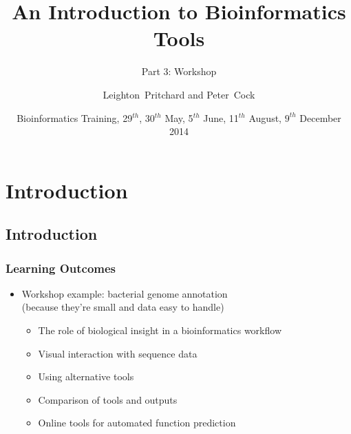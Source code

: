 
%



\title[Intro to Bioinformatics] %
{An Introduction to Bioinformatics Tools}
\subtitle{Part 3: Workshop}
\author[Pritchard, Cock] %
{Leighton~Pritchard and Peter~Cock}
\date[May, June, August, December 2014] %
{Bioinformatics Training, 29$^{th}$, 30$^{th}$ May, 5$^{th}$ June, 11$^{th}$ August, $9^{th}$ December 2014}
\subject{Bioinformatics}





\frame[plain]{\titlepage}
 
\section{Introduction}
\subsection{Introduction}
\begin{frame}
  \frametitle{Learning Outcomes}
  \begin{itemize}
    \item Workshop example: bacterial genome annotation \\
             (because they're small and data easy to handle)
    \begin{itemize}
      \item The role of biological insight in a bioinformatics workflow
      \item Visual interaction with sequence data
      \item Using alternative tools
      \item Comparison of tools and outputs
      \item Online tools for automated function prediction
    \end{itemize}
  \end{itemize}
\end{frame} 
  
